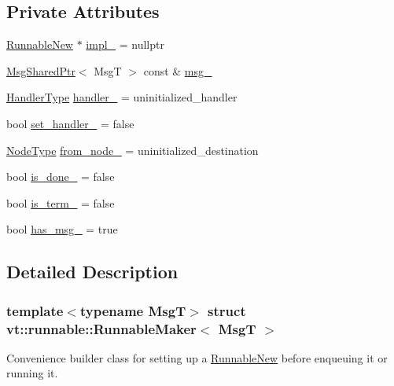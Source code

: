 \subsection*{Private Attributes}
\begin{DoxyCompactItemize}
\item 
\hyperlink{structvt_1_1runnable_1_1_runnable_new}{Runnable\+New} $\ast$ \hyperlink{structvt_1_1runnable_1_1_runnable_maker_abae85bf10b5b296af40656123ec5a111}{impl\+\_\+} = nullptr
\item 
\hyperlink{namespacevt_ab2b3d506ec8e8d1540aede826d84a239}{Msg\+Shared\+Ptr}$<$ MsgT $>$ const  \& \hyperlink{structvt_1_1runnable_1_1_runnable_maker_a95ea956b75e1ea1ca8084462cc35f4bf}{msg\+\_\+}
\item 
\hyperlink{namespacevt_af64846b57dfcaf104da3ef6967917573}{Handler\+Type} \hyperlink{structvt_1_1runnable_1_1_runnable_maker_a627ad83f0608f9b91c5ecedecf2f8d75}{handler\+\_\+} = uninitialized\+\_\+handler
\item 
bool \hyperlink{structvt_1_1runnable_1_1_runnable_maker_a52fd27acc3c3259743fdd7aed09d690d}{set\+\_\+handler\+\_\+} = false
\item 
\hyperlink{namespacevt_a866da9d0efc19c0a1ce79e9e492f47e2}{Node\+Type} \hyperlink{structvt_1_1runnable_1_1_runnable_maker_ad053690f0793a709289f3c1d240a2851}{from\+\_\+node\+\_\+} = uninitialized\+\_\+destination
\item 
bool \hyperlink{structvt_1_1runnable_1_1_runnable_maker_a1a09d169753ee4c91ba1b42c291038f0}{is\+\_\+done\+\_\+} = false
\item 
bool \hyperlink{structvt_1_1runnable_1_1_runnable_maker_a1f1afd6fa4a701c8e620e30838099725}{is\+\_\+term\+\_\+} = false
\item 
bool \hyperlink{structvt_1_1runnable_1_1_runnable_maker_a0cd87f711041bf7cfa22ef5746ee880c}{has\+\_\+msg\+\_\+} = true
\end{DoxyCompactItemize}


\subsection{Detailed Description}
\subsubsection*{template$<$typename MsgT$>$\newline
struct vt\+::runnable\+::\+Runnable\+Maker$<$ Msg\+T $>$}

Convenience builder class for setting up a {\ttfamily \hyperlink{structvt_1_1runnable_1_1_runnable_new}{Runnable\+New}} before enqueuing it or running it. 

